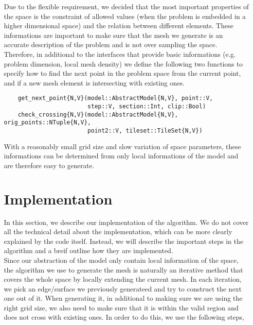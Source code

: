 \documentclass[10pt,fleqn]{article}
\begin{document}
Due to the flexible requirement, we decided that the most important properties
of the space is the constraint of allowed values (when the problem is embedded
in a higher dimensional space) and the relation between different elements.
These informations are important to make sure that the mesh we generate is
an accurate description of the problem and is not over sampling the space.
Therefore, in additional to the interfaces that provide basic informations
(e.g. problem dimension, local mesh density) we define the following two
functions to specify how to find the next point in the problem space from
the current point, and if a new mesh element is intersecting with existing
ones.

\begin{lstlisting}
    get_next_point{N,V}(model::AbstractModel{N,V}, point::V,
                        step::V, section::Int, clip::Bool)
    check_crossing{N,V}(model::AbstractModel{N,V}, orig_points::NTuple{N,V},
                        point2::V, tileset::TileSet{N,V})
\end{lstlisting}

With a reasonably small grid size and slow variation of space parameters, these
informations can be determined from only local informations of the model and
are therefore easy to generate.

\section{Implementation}

In this section, we describe our implementation of the algorithm. We do not
cover all the technical detail about the implementation, which can be more
clearly explained by the code itself. Instead, we will describe the important
steps in the algorithm and a breif outline how they are implemented.\\

Since our abstraction of the model only contain local information of the space,
the algorithm we use to generate the mesh is naturally an iterative method
that covers the whole space by locally extending the current mesh. In each
iteration, we pick an edge/surface we previously generateed and try to construct
the next one out of it. When generating it, in additional to making sure we are
using the right grid size, we also need to make sure that it is within the valid
region and does not cross with existing ones. In order to do this, we use the
following steps,
\end{document}
